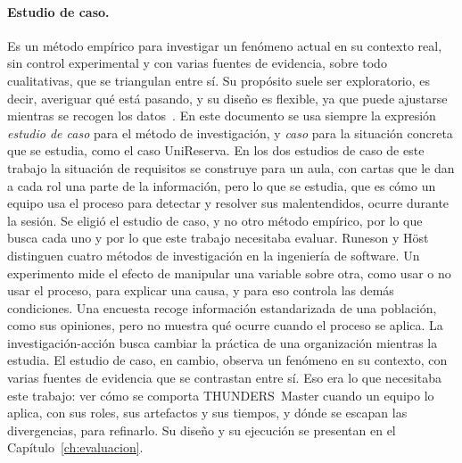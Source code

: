 \documentclass[12pt,letterpaper,oneside]{report}
\begin{document}
\paragraph{Estudio de caso.}
Es un método empírico para investigar un fenómeno actual en su contexto real,
sin control experimental y con varias fuentes de evidencia, sobre todo
cualitativas, que se triangulan entre sí. Su propósito suele ser exploratorio,
es decir, averiguar qué está pasando, y su diseño es flexible, ya que puede
ajustarse mientras se recogen los datos~\cite{runeson2009case}. En este documento se usa siempre
la expresión \emph{estudio de caso} para el método de investigación, y
\emph{caso} para la situación concreta que se estudia, como el caso UniReserva.
En los dos estudios de caso de este trabajo la situación de requisitos se
construye para un aula, con cartas que le dan a cada rol una parte de la
información, pero lo que se estudia, que es cómo un equipo usa el proceso para
detectar y resolver sus malentendidos, ocurre durante la sesión.
Se eligió el estudio de caso, y no otro método empírico, por lo que busca cada
uno y por lo que este trabajo necesitaba evaluar. Runeson y
Höst~\cite{runeson2009case} distinguen cuatro métodos de investigación en la
ingeniería de software. Un experimento mide el efecto de manipular una variable
sobre otra, como usar o no usar el proceso, para explicar una causa, y para eso
controla las demás condiciones. Una encuesta recoge información estandarizada de
una población, como sus opiniones, pero no muestra qué ocurre cuando el proceso
se aplica. La investigación-acción busca cambiar la práctica de una organización
mientras la estudia. El estudio de caso, en cambio, observa un fenómeno en su
contexto, con varias fuentes de evidencia que se contrastan entre sí. Eso era lo
que necesitaba este trabajo: ver cómo se comporta THUNDERS~Master cuando un
equipo lo aplica, con sus roles, sus artefactos y sus tiempos, y dónde se
escapan las divergencias, para refinarlo. Su diseño y su ejecución se presentan
en el Capítulo~\ref{ch:evaluacion}.
\end{document}
